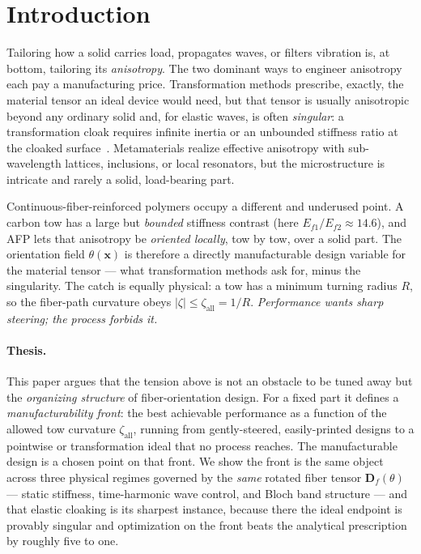 \documentclass[preprint,11pt]{elsarticle}
\newcommand{\vx}{\mathbf{x}}
\newcommand{\Df}{\mathbf{D}_f}
\newcommand{\zall}{\zeta_{\mathrm{all}}}
\theoremstyle{plain}\newtheorem{proposition}{Proposition}
\theoremstyle{remark}\newtheorem{remark}{Remark}
\begin{document}
\section{Introduction}
\label{sec:intro}
Tailoring how a solid carries load, propagates waves, or filters vibration is, at
bottom, tailoring its \emph{anisotropy}. The two dominant ways to engineer anisotropy
each pay a manufacturing price. Transformation methods prescribe, exactly, the material
tensor an ideal device would need, but that tensor is usually anisotropic beyond any
ordinary solid and, for elastic waves, is often \emph{singular}: a transformation cloak
requires infinite inertia or an unbounded stiffness ratio at the cloaked
surface~\cite{norris2008,pendry2006}. Metamaterials realize effective anisotropy with
sub-wavelength lattices, inclusions, or local resonators, but the microstructure is
intricate and rarely a solid, load-bearing part.

Continuous-fiber-reinforced polymers occupy a different and underused point. A carbon
tow has a large but \emph{bounded} stiffness contrast (here $E_{f1}/E_{f2}\approx14.6$),
and AFP lets that anisotropy be \emph{oriented locally}, tow by tow, over a solid part.
The orientation field $\theta(\vx)$ is therefore a directly manufacturable design
variable for the material tensor --- what transformation methods ask for, minus the
singularity. The catch is equally physical: a tow has a minimum turning radius $R$, so
the fiber-path curvature obeys $|\zeta|\le\zall=1/R$. \emph{Performance wants sharp
steering; the process forbids it.}

\paragraph{Thesis.} This paper argues that the tension above is not an obstacle to be
tuned away but the \emph{organizing structure} of fiber-orientation design. For a fixed
part it defines a \emph{manufacturability front}: the best achievable performance as a
function of the allowed tow curvature $\zall$, running from gently-steered, easily-printed
designs to a pointwise or transformation ideal that no process reaches. The
manufacturable design is a chosen point on that front. We show the front is the same
object across three physical regimes governed by the \emph{same} rotated fiber tensor
$\Df(\theta)$ --- static stiffness, time-harmonic wave control, and Bloch band structure
--- and that elastic cloaking is its sharpest instance, because there the ideal endpoint
is provably singular and optimization on the front beats the analytical prescription by
roughly five to one.
\end{document}
